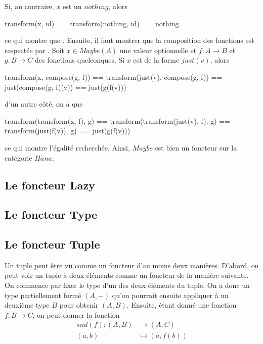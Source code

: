 Si, au contraire, $x$ est un $nothing$, alors
\begin{cpp}
    transform(x, id) == transform(nothing, id)
                     == nothing
\end{cpp}

ce qui montre que . Ensuite, il faut montrer
que la composition des fonctions est respectée par . Soit
$x \in Maybe(A)$ une valeur optionnelle et $f : A \to B$ et $g : B \to C$
des fonctions quelconques. Si $x$ est de la forme $just(v)$, alors
\begin{cpp}
    transform(x, compose(g, f)) == transform(just(v), compose(g, f))
                                == just(compose(g, f)(v))
                                == just(g(f(v)))
\end{cpp}

d'un autre côté, on a que
\begin{cpp}
    transform(transform(x, f), g) == transform(transform(just(v), f), g)
                                  == transform(just(f(v)), g)
                                  == just(g(f(v)))
\end{cpp}

ce qui montre l'égalité recherchée. Ainsi, $Maybe$ est bien un foncteur
sur la catégorie $Hana$.



\subsection{Le foncteur Lazy}


\subsection{Le foncteur Type}



\subsection{Le foncteur Tuple}
Un tuple peut être vu comme un foncteur d'au moins deux manières. D'abord,
on peut voir un tuple à deux éléments comme un foncteur de la manière suivante.
On commence par fixer le type d'un des deux éléments du tuple. On a donc un
type partiellement formé $(A, -)$ qu'on pourrait ensuite appliquer à un
deuxième type $B$ pour obtenir $(A, B)$. Ensuite, étant donné une fonction
$f : B \to C$, on peut donner la fonction
\begin{align*}
    snd(f) : (A, B) &\to (A, C)             \\
             (a, b) &\mapsto (a, f(b))
\end{align*}

